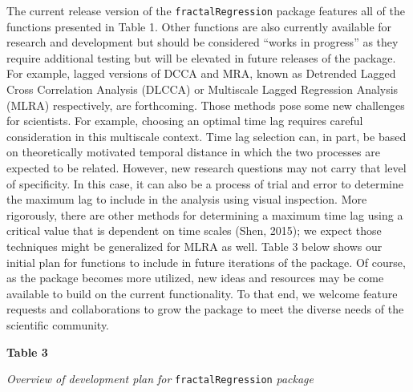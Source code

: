 \documentclass[
  man]{apa6}
\begin{document}
The current release version of the \texttt{fractalRegression} package features
all of the functions presented in Table 1. Other functions are also
currently available for research and development but should be
considered ``works in progress'' as they require additional testing but
will be elevated in future releases of the package. For example, lagged
versions of DCCA and MRA, known as Detrended Lagged Cross Correlation
Analysis (DLCCA) or Multiscale Lagged Regression Analysis (MLRA)
respectively, are forthcoming. Those methods pose some new challenges
for scientists. For example, choosing an optimal time lag requires
careful consideration in this multiscale context. Time lag selection
can, in part, be based on theoretically motivated temporal distance in
which the two processes are expected to be related. However, new
research questions may not carry that level of specificity. In this
case, it can also be a process of trial and error to determine the
maximum lag to include in the analysis using visual inspection. More
rigorously, there are other methods for determining a maximum time lag
using a critical value that is dependent on time scales (Shen, 2015); we
expect those techniques might be generalized for MLRA as well. Table 3
below shows our initial plan for functions to include in future
iterations of the package. Of course, as the package becomes more
utilized, new ideas and resources may be come available to build on the
current functionality. To that end, we welcome feature requests and
collaborations to grow the package to meet the diverse needs of the
scientific community.

\textbf{Table 3}

\emph{Overview of development plan for} \texttt{fractalRegression} \emph{package}
\end{document}
